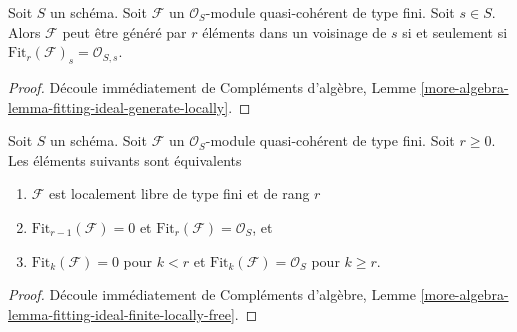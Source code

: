 \begin{lemma}
\label{lemma-fitting-ideal-generate-locally}
Soit  $S$  un schéma. Soit  $\mathcal{F}$  un  $\mathcal{O}_S$-module
quasi-cohérent de type fini. Soit  $s \in S$. Alors  $\mathcal{F}$  peut être
généré par  $r$  éléments dans un voisinage de  $s$  si et seulement
si  $\text{Fit}_r(\mathcal{F})_s = \mathcal{O}_{S, s}$.
\end{lemma}

\begin{proof}
Découle immédiatement de Compléments d'algèbre, Lemme  \ref{more-algebra-lemma-fitting-ideal-generate-locally}.
\end{proof}

\begin{lemma}
\label{lemma-fitting-ideal-finite-locally-free}
Soit  $S$  un schéma. Soit  $\mathcal{F}$  un  $\mathcal{O}_S$-module
quasi-cohérent de type fini. Soit  $r \geq 0$. Les éléments suivants sont
équivalents
\begin{enumerate}
\item $\mathcal{F}$  est localement libre de type fini et de rang  $r$
\item $\text{Fit}_{r - 1}(\mathcal{F}) = 0$  et  $\text{Fit}_r(\mathcal{F}) = \mathcal{O}_S$, et
\item $\text{Fit}_k(\mathcal{F}) = 0$  pour  $k < r$  et  $\text{Fit}_k(\mathcal{F}) = \mathcal{O}_S$  pour  $k \geq r$.
\end{enumerate}
\end{lemma}

\begin{proof}
Découle immédiatement de Compléments d'algèbre, Lemme  \ref{more-algebra-lemma-fitting-ideal-finite-locally-free}.
\end{proof}

